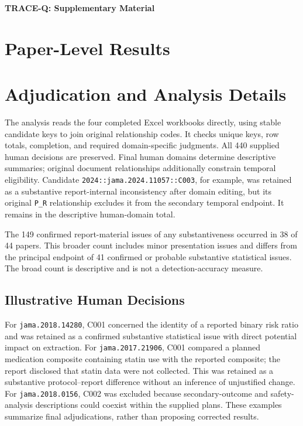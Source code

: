 \documentclass[11pt,a4paper]{article}
\begin{document}
\begin{center}{\Large\bfseries TRACE-Q: Supplementary Material}\end{center}

\section{Paper-Level Results}


\section{Adjudication and Analysis Details}
The analysis reads the four completed Excel workbooks directly, using stable candidate keys to join original relationship codes. It checks unique keys, row totals, completion, and required domain-specific judgments. All 440 supplied human decisions are preserved. Final human domains determine descriptive summaries; original document relationships additionally constrain temporal eligibility. Candidate \texttt{2024::jama.2024.11057::C003}, for example, was retained as a substantive report-internal inconsistency after domain editing, but its original \texttt{P\_R} relationship excludes it from the secondary temporal endpoint. It remains in the descriptive human-domain total.

The 149 confirmed report-material issues of any substantiveness occurred in 38 of 44 papers. This broader count includes minor presentation issues and differs from the principal endpoint of 41 confirmed or probable substantive statistical issues. The broad count is descriptive and is not a detection-accuracy measure.

\subsection{Illustrative Human Decisions}
For \texttt{jama.2018.14280}, C001 concerned the identity of a reported binary risk ratio and was retained as a confirmed substantive statistical issue with direct potential impact on extraction. For \texttt{jama.2017.21906}, C001 compared a planned medication composite containing statin use with the reported composite; the report disclosed that statin data were not collected. This was retained as a substantive protocol--report difference without an inference of unjustified change. For \texttt{jama.2018.0156}, C002 was excluded because secondary-outcome and safety-analysis descriptions could coexist within the supplied plans. These examples summarize final adjudications, rather than proposing corrected results.
\end{document}
